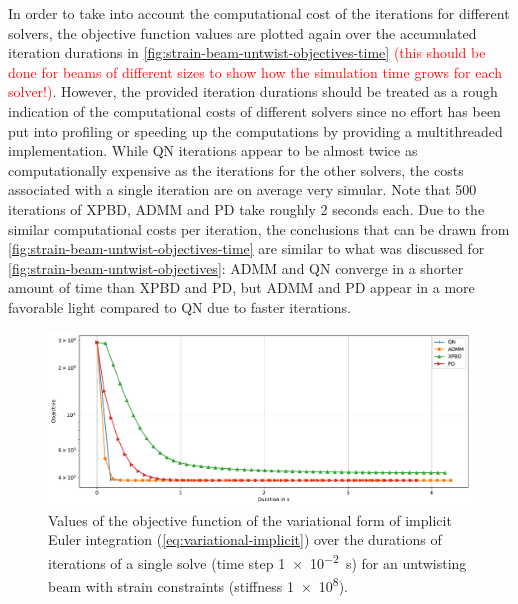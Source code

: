In order to take into account the computational cost of the iterations for different solvers, the objective function values are plotted again over the accumulated
iteration durations in \autoref{fig:strain-beam-untwist-objectives-time} \textcolor{red}{(this should be done for beams of different sizes to show how the simulation
time grows for each solver!)}. However, the provided iteration durations should be treated as a rough indication of the 
computational costs of different solvers since no effort has been put into profiling or speeding up the computations by providing a multithreaded 
implementation. While QN iterations appear to be almost twice as computationally expensive as the iterations 
for the other solvers, the costs associated with a single iteration are on average very simular. Note that 500 iterations of XPBD, ADMM and PD 
take roughly 2 seconds each. Due to the similar computational costs per iteration, the conclusions that can be drawn from \autoref{fig:strain-beam-untwist-objectives-time}
are similar to what was discussed for \autoref{fig:strain-beam-untwist-objectives}: ADMM and QN converge in a shorter amount of time than XPBD and PD, but ADMM and PD
appear in a more favorable light compared to QN due to faster iterations.

\begin{figure}[h]
    \includegraphics[width=\textwidth]{figures/strain_beam_untwist_objectives_time.pdf}
    \caption{Values of the objective function of the variational form of implicit Euler integration (\cref{eq:variational-implicit}) over the durations of iterations 
        of a single solve (time step \SI{1e-2}{\second}) for an untwisting beam with strain constraints (stiffness \num{1e8}).}
    \label{fig:strain-beam-untwist-objectives-time}
\end{figure}


